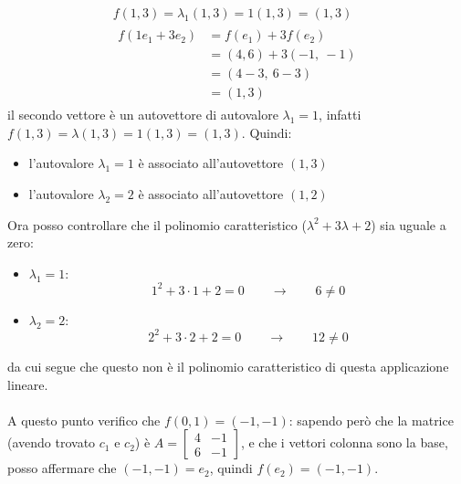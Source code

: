 \documentclass[italian]{article}
\begin{document}
\begin{gather*}
	f(1,3) = \lambda_1(1,3) = 1(1,3) = (1,3) \\
	\begin{split}
		f(1e_1 + 3e_2) &= f(e_1) + 3f(e_2) \\
		&= (4,6) + 3(-1,\ -1) \\
		&= (4-3,\ 6-3) \\
		&= (1,3)
	\end{split}
\end{gather*}
il secondo vettore è un autovettore di autovalore $\lambda_1=1$, infatti $f(1,3) = \lambda(1,3) = 1(1,3) = (1,3)$.
Quindi:
\begin{itemize}
	\item l'autovalore $\lambda_1 = 1$ è associato all'autovettore $(1,3)$
	\item l'autovalore $\lambda_2 = 2$ è associato all'autovettore $(1,2)$
\end{itemize}
Ora posso controllare che il polinomio caratteristico ($\lambda^2 + 3\lambda + 2$) sia uguale a zero:
\begin{itemize}
	\item $\lambda_1=1$:
		\[
			1^2 + 3\cdot1 + 2 = 0 \qquad \to \qquad 6 \neq 0
		\]
	\item $\lambda_2=2$:
	\[
		2^2 + 3\cdot2 + 2 = 0 \qquad \to \qquad 12 \neq 0
	\]
\end{itemize}
da cui segue che questo non è il polinomio caratteristico di questa applicazione lineare.\\\\
A questo punto verifico che $f(0,1) = (-1,-1)$: sapendo però che la matrice (avendo trovato $c_1$ e $c_2$) è $A = \begin{bmatrix}4 & -1 \\ 6 & -1\end{bmatrix}$, e che i vettori colonna sono la base, posso affermare che $(-1,-1)=e_2$, quindi $f(e_2) = (-1,-1)$. 





\newpage
\end{document}
